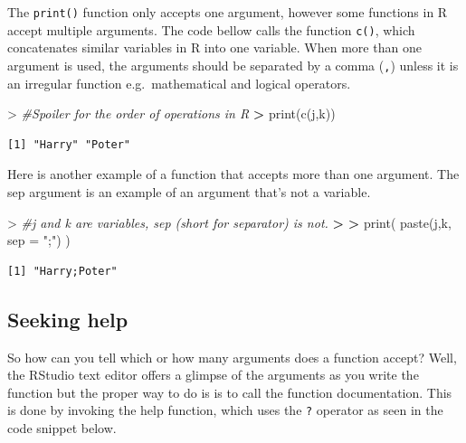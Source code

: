 \documentclass[
]{book}
\newenvironment{Shaded}{\begin{snugshade}}{\end{snugshade}}
\newcommand{\AttributeTok}[1]{\textcolor[rgb]{0.77,0.63,0.00}{#1}}
\newcommand{\CommentTok}[1]{\textcolor[rgb]{0.56,0.35,0.01}{\textit{#1}}}
\newcommand{\ErrorTok}[1]{\textcolor[rgb]{0.64,0.00,0.00}{\textbf{#1}}}
\newcommand{\FunctionTok}[1]{\textcolor[rgb]{0.00,0.00,0.00}{#1}}
\newcommand{\NormalTok}[1]{#1}
\newcommand{\SpecialCharTok}[1]{\textcolor[rgb]{0.00,0.00,0.00}{#1}}
\newcommand{\StringTok}[1]{\textcolor[rgb]{0.31,0.60,0.02}{#1}}
\theoremstyle{definition}
\theoremstyle{definition}
\theoremstyle{definition}
\theoremstyle{definition}
\theoremstyle{remark}
\begin{document}
The \texttt{print()} function only accepts one argument, however some functions in R accept multiple arguments. The code bellow
calls the function \texttt{c()}, which concatenates similar variables in R into one variable. When more than one
argument is used, the arguments should be separated by a comma (\texttt{,}) unless it is an irregular function e.g.~mathematical
and logical operators.

\begin{Shaded}
\begin{Highlighting}[]
\SpecialCharTok{\textgreater{}} \CommentTok{\#Spoiler for the order of operations in R}
\ErrorTok{\textgreater{}} \FunctionTok{print}\NormalTok{(}\FunctionTok{c}\NormalTok{(j,k))}
\end{Highlighting}
\end{Shaded}

\begin{verbatim}
[1] "Harry" "Poter"
\end{verbatim}

Here is another example of a function that accepts more than one argument. The sep argument is an example of an
argument that's not a variable.

\begin{Shaded}
\begin{Highlighting}[]
\SpecialCharTok{\textgreater{}} \CommentTok{\#j and k are variables, sep (short for separator) is not.}
\ErrorTok{\textgreater{}} 
\ErrorTok{\textgreater{}} \FunctionTok{print}\NormalTok{( }\FunctionTok{paste}\NormalTok{(j,k, }\AttributeTok{sep =} \StringTok{";"}\NormalTok{) )}
\end{Highlighting}
\end{Shaded}

\begin{verbatim}
[1] "Harry;Poter"
\end{verbatim}

\hypertarget{seeking-help}{%
\subsection*{\texorpdfstring{\textbf{Seeking help}}{Seeking help}}\label{seeking-help}}

So how can you tell which or how many arguments does a function accept? Well, the RStudio text editor offers a
glimpse of the arguments as you write the function but the proper way to do is is to call the function documentation.
This is done by invoking the help function, which uses the \texttt{?} operator as seen in the code snippet below.
\end{document}
